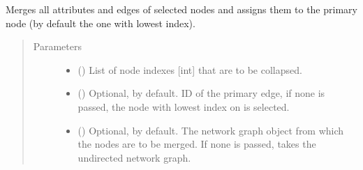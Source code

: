 \documentclass[letterpaper,10pt,english]{sphinxmanual}
\begin{document}
\begin{fulllineitems}
\begin{fulllineitems}
\begin{quote}
\begin{description}
\begin{itemize}
\end{itemize}

\end{description}\end{quote}

\end{fulllineitems}


\begin{fulllineitems}
\label{\detokenize{main:pypath.main.PyPath.merge_nodes}}
Merges all attributes and edges of selected nodes and assigns
them to the primary node (by default the one with lowest index).
\begin{quote}\begin{description}
\item[{Parameters}] \leavevmode\begin{itemize}
\item {} 
 () \textendash{} List of node indexes {[}int{]} that are to be collapsed.

\item {} 
 () \textendash{} Optional,  by default. ID of the primary edge, if
none is passed, the node with lowest index on  is
selected.

\item {} 
 () \textendash{} Optional,  by default. The network graph object from
which the nodes are to be merged. If none is passed, takes
the undirected network graph.

\end{itemize}

\end{description}\end{quote}

\end{fulllineitems}


\begin{fulllineitems}
\label{\detokenize{main:pypath.main.PyPath.mimp_directions}}
\end{fulllineitems}


\end{fulllineitems}
\end{document}
